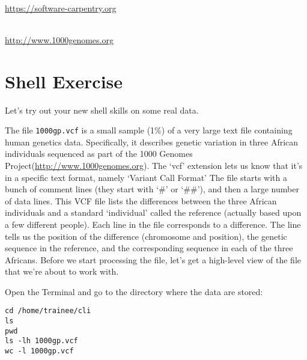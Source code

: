 \begin{description}[style=multiline,labelindent=0cm,align=left,leftmargin=0.5cm]
  \item [Software Carpentry]\hfill\\
    \url{https://software-carpentry.org}
  \item [1000Genome Project data for example]\hfill\\
    \url{http://www.1000genomes.org}
\end{description}

\newpage
\section{Shell Exercise}

\begin{information}
Let's try out your new shell skills on some real data.

The file \texttt{1000gp.vcf} is a small sample (1\%) of a very large text file containing human genetics data. Specifically, it describes genetic variation in three African individuals sequenced as part of the 1000 Genomes Project(\url{http://www.1000genomes.org}).
The `vcf' extension lets us know that it's in a specific text format, namely `Variant Call Format' The file starts with a bunch of comment lines (they start with `\#' or `\#\#'), and then a large number of data lines. This VCF file lists the differences between the three African individuals and a standard `individual' called the reference (actually based upon a few different people). Each line in the file corresponds to a difference. The line tells us the position of the difference (chromosome and position), the genetic sequence in the reference, and the corresponding sequence in each of the three Africans.
Before we start processing the file, let's get a high-level view of the file that we're about to work with.

\end{information}

\begin{steps}
Open the Terminal and go to the directory where the data are stored:
\begin{lstlisting}
cd /home/trainee/cli
ls
pwd
ls -lh 1000gp.vcf
wc -l 1000gp.vcf
\end{lstlisting}
\end{steps}

